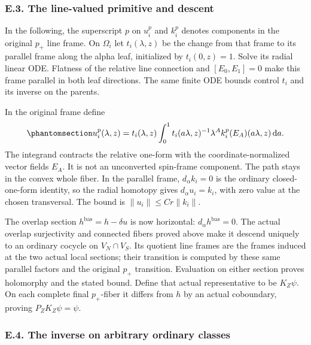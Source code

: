 \documentclass[
  english,
  11pt,
  reqno]{amsart}
\begin{document}
\protect{}\label{sec:gg-penrose-typed-primitive}

\subsubsection{E.3. The line-valued primitive and
descent}\label{e.3.-the-line-valued-primitive-and-descent}

In the following, the superscript \(p\) on \(u_i^p\) and \(k_i^p\)
denotes components in the original \(p_+\) line frame. On \(\Omega_i\)
let \(t_i(\lambda,z)\) be the change from that frame to its parallel
frame along the alpha leaf, initialized by \(t_i(0,z)=1\). Solve its
radial linear ODE. Flatness of the relative line connection and
\([E_0,E_1]=0\) make this frame parallel in both leaf directions. The
same finite ODE bounds control \(t_i\) and its inverse on the parents.

In the original frame define
\begin{equation}\protect\phantomsection\label{eq:gg-penrose-typed-line-primitive}{
 u_i^p(\lambda,z)=t_i(\lambda,z)
 \int_0^1t_i(a\lambda,z)^{-1}
          \lambda^A k_i^p(E_A)(a\lambda,z)\,\mathrm da .
}\end{equation} The integrand contracts the relative one-form with the
coordinate-normalized vector fields \(E_A\). It is not an unconverted
spin-frame component. The path stays in the convex whole fiber. In the
parallel frame, \(d_\alpha k_i=0\) is the ordinary closed-one-form
identity, so the radial homotopy gives \(d_\alpha u_i=k_i\), with zero
value at the chosen transversal. The bound is \(\|u_i\|\le Cr\|k_i\|\).

The overlap section \(h^{\mathrm{bas}}=h-\delta u\) is now horizontal:
\(d_\alpha h^{\mathrm{bas}}=0\). The actual overlap surjectivity and
connected fibers proved above make it descend uniquely to an ordinary
cocycle on \(V_N\cap V_S\). Its quotient line frames are the frames
induced at the two actual local sections; their transition is computed
by these same parallel factors and the original \(p_+\) transition.
Evaluation on either section proves holomorphy and the stated bound.
Define that actual representative to be \(K_Z\psi\). On each complete
final \(p_+\)-fiber it differs from \(h\) by an actual coboundary,
proving \(P_ZK_Z\psi=\psi\).

\protect{}\label{sec:gg-penrose-actual-coboundary}

\subsubsection{E.4. The inverse on arbitrary ordinary
classes}\label{e.4.-the-inverse-on-arbitrary-ordinary-classes}
\end{document}
